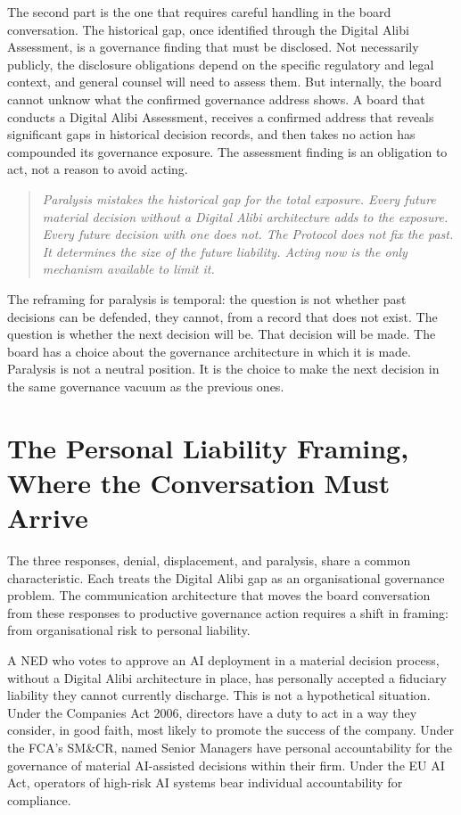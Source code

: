 The second part is the one that requires careful handling in the board conversation. The historical gap, once identified through the Digital Alibi Assessment, is a governance finding that must be disclosed. Not necessarily publicly, the disclosure obligations depend on the specific regulatory and legal context, and general counsel will need to assess them. But internally, the board cannot unknow what the confirmed governance address shows. A board that conducts a Digital Alibi Assessment, receives a confirmed address that reveals significant gaps in historical decision records, and then takes no action has compounded its governance exposure. The assessment finding is an obligation to act, not a reason to avoid acting.

\begin{quote}
\emph{Paralysis mistakes the historical gap for the total exposure. Every future material decision without a Digital Alibi architecture adds to the exposure. Every future decision with one does not. The Protocol does not fix the past. It determines the size of the future liability. Acting now is the only mechanism available to limit it.}
\end{quote}

The reframing for paralysis is temporal: the question is not whether past decisions can be defended, they cannot, from a record that does not exist. The question is whether the next decision will be. That decision will be made. The board has a choice about the governance architecture in which it is made. Paralysis is not a neutral position. It is the choice to make the next decision in the same governance vacuum as the previous ones.

\scenebreak

\section{The Personal Liability Framing, Where the Conversation Must Arrive}

The three responses, denial, displacement, and paralysis, share a common characteristic. Each treats the Digital Alibi gap as an organisational governance problem. The communication architecture that moves the board conversation from these responses to productive governance action requires a shift in framing: from organisational risk to personal liability.

A NED who votes to approve an AI deployment in a material decision process, without a Digital Alibi architecture in place, has personally accepted a fiduciary liability they cannot currently discharge. This is not a hypothetical situation. Under the Companies Act 2006, directors have a duty to act in a way they consider, in good faith, most likely to promote the success of the company. Under the FCA's SM\&CR, named Senior Managers have personal accountability for the governance of material AI-assisted decisions within their firm. Under the EU AI Act, operators of high-risk AI systems bear individual accountability for compliance.

